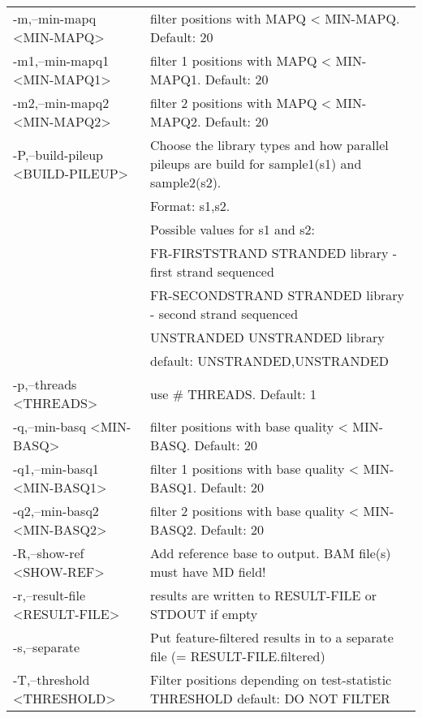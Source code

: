\documentclass[10pt, a4paper]{article}
\begin{document}
\begin{center}
{\begin{longtable}{p{}p{}}
 -m,--min-mapq <MIN-MAPQ>                       & filter positions with MAPQ < MIN-MAPQ. Default: 20 \\
 -m1,--min-mapq1 <MIN-MAPQ1>                    & filter 1 positions with MAPQ < MIN-MAPQ1. Default: 20 \\
 -m2,--min-mapq2 <MIN-MAPQ2>                    & filter 2 positions with MAPQ < MIN-MAPQ2. Default: 20 \\
 -P,--build-pileup <BUILD-PILEUP>               & Choose the library types and how parallel pileups are build for sample1(s1) and sample2(s2). \\
                                                & Format: s1,s2. \\
                                                & Possible values for s1 and s2: \\
                                                & FR-FIRSTSTRAND    STRANDED library - first strand sequenced \\
                                                & FR-SECONDSTRAND   STRANDED library - second strand sequenced \\
                                                & UNSTRANDED    UNSTRANDED library \\
                                                & default: UNSTRANDED,UNSTRANDED \\
 -p,--threads <THREADS>                         & use \# THREADS. Default: 1 \\
 -q,--min-basq <MIN-BASQ>                       & filter positions with base quality < MIN-BASQ. Default: 20 \\
 -q1,--min-basq1 <MIN-BASQ1>                    & filter 1 positions with base quality < MIN-BASQ1. Default: 20 \\
 -q2,--min-basq2 <MIN-BASQ2>                    & filter 2 positions with base quality < MIN-BASQ2. Default: 20 \\
 -R,--show-ref <SHOW-REF>                       & Add reference base to output. BAM file(s) must have MD field! \\
 -r,--result-file <RESULT-FILE>                 & results are written to RESULT-FILE or STDOUT if empty \\
 -s,--separate                                  & Put feature-filtered results in to a separate file (= RESULT-FILE.filtered)\\
 -T,--threshold <THRESHOLD>                     & Filter positions depending on test-statistic THRESHOLD default: DO NOT FILTER \\

\end{longtable}}
\end{center}
\end{document}
